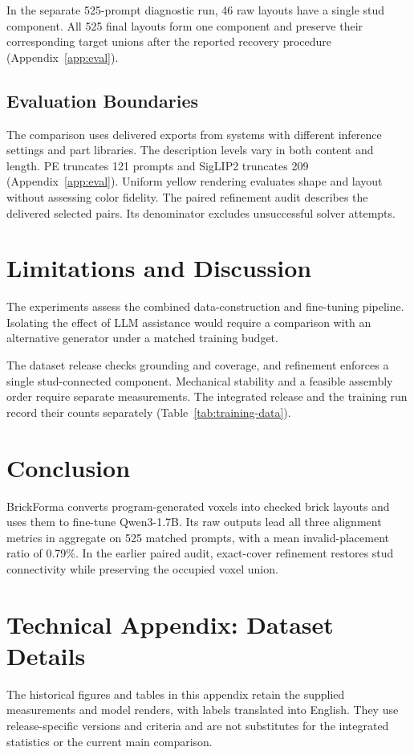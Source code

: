 \documentclass[letterpaper]{article} %
\begin{document}
In the separate 525-prompt diagnostic run, 46 raw layouts have a single stud component. All 525 final layouts form one component and preserve their corresponding target unions after the reported recovery procedure (Appendix~\ref{app:eval}).

\subsection{Evaluation Boundaries}
The comparison uses delivered exports from systems with different inference settings and part libraries. The description levels vary in both content and length. PE truncates 121 prompts and SigLIP2 truncates 209 (Appendix~\ref{app:eval}). Uniform yellow rendering evaluates shape and layout without assessing color fidelity. The paired refinement audit describes the delivered selected pairs. Its denominator excludes unsuccessful solver attempts.


\section{Limitations and Discussion}
The experiments assess the combined data-construction and fine-tuning pipeline. Isolating the effect of LLM assistance would require a comparison with an alternative generator under a matched training budget.

The dataset release checks grounding and coverage, and refinement enforces a single stud-connected component. Mechanical stability and a feasible assembly order require separate measurements. The integrated release and the training run record their counts separately (Table~\ref{tab:training-data}).

\section{Conclusion}
BrickForma converts program-generated voxels into checked brick layouts and uses them to fine-tune Qwen3-1.7B. Its raw outputs lead all three alignment metrics in aggregate on 525 matched prompts, with a mean invalid-placement ratio of 0.79\%. In the earlier paired audit, exact-cover refinement restores stud connectivity while preserving the occupied voxel union.


\FloatBarrier
\appendix
\section{Technical Appendix: Dataset Details}
\label{app:dataset}
The historical figures and tables in this appendix retain the supplied measurements and model renders, with labels translated into English. They use release-specific versions and criteria and are not substitutes for the integrated statistics or the current main comparison.
\end{document}
